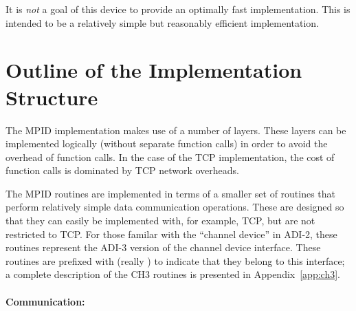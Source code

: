 \documentclass{article}
\begin{document}
It is \emph{not} a goal of this device to provide an optimally fast
implementation. This is  
intended to be a relatively simple but reasonably efficient implementation.


\section{Outline of the Implementation Structure}
\label{sec:impl-outline}

The MPID implementation makes use of a number of layers.  These layers
can be implemented logically (without separate function calls) in
order to avoid the overhead of function calls.  In the case of the TCP
implementation, the cost of function calls is dominated by TCP network
overheads.  


The MPID routines are implemented in terms of a smaller set of routines that
perform relatively simple data communication operations.  These are designed
so that they can easily be implemented with, for example, TCP, but are not
restricted to TCP.  For those familar with the ``channel device'' in ADI-2,
these routines represent the ADI-3 version of the channel device interface.
These routines are prefixed with  (really ) to
indicate that they belong to 
this interface; a complete description of the CH3 routines is presented in
Appendix~\ref{app:ch3}. 

\paragraph{Communication:}
\end{document}
